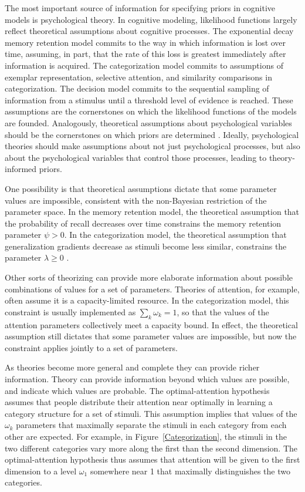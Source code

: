 The most important source of information for specifying priors in cognitive models is psychological theory. In cognitive modeling, likelihood functions largely reflect theoretical assumptions about cognitive processes. The exponential decay memory retention model commits to the way in which information is lost over time, assuming, in part, that the rate of this loss is greatest immediately after information is acquired. The categorization model commits to assumptions of exemplar representation, selective attention, and similarity comparisons in categorization. The decision model commits to the sequential sampling of information from a stimulus until a threshold level of evidence is reached. These assumptions are the cornerstones on which the likelihood functions of the models are founded. Analogously, theoretical assumptions about psychological variables should be the cornerstones on which priors are determined \cite{Vanpaemel2009,Vanpaemel2010}. Ideally, psychological theories should make assumptions about not just psychological processes, but also about the psychological variables that control those processes, leading to theory-informed priors.

One possibility is that theoretical assumptions dictate that some parameter values are impossible, consistent with the non-Bayesian restriction of the parameter space. In the memory retention model, the theoretical assumption that the probability of recall decreases over time constrains the memory retention parameter $\psi > 0$. In the categorization model, the theoretical assumption that generalization gradients decrease as stimuli become less similar, constrains the parameter $\lambda \geq 0$ \cite{Nosofsky1986,Shepard1987}. 

Other sorts of theorizing can provide more elaborate information about possible combinations of values for a set of parameters. Theories of attention, for example, often assume it is a capacity-limited resource. In the categorization model, this constraint is usually implemented as $\sum_k \omega_k =1$, so that the values of the attention parameters collectively meet a capacity bound. In effect, the theoretical assumption still dictates that some parameter values are impossible, but now the constraint applies jointly to a set of parameters.

As theories become more general and complete they can provide richer information. Theory can provide information beyond which values are possible, and indicate which values are probable. The optimal-attention hypothesis \cite{Nosofsky1986} assumes that people distribute their attention near optimally in learning a category structure for a set of stimuli. This assumption implies that values of the $\omega_k$ parameters that maximally separate the stimuli in each category from each other are expected. For example, in Figure~\ref{Categorization}, the stimuli in the two different categories vary more along the first than the second dimension. The optimal-attention hypothesis thus assumes that attention will be given to the first dimension to a level $\omega_1$ somewhere near 1 that maximally distinguishes the two categories.

